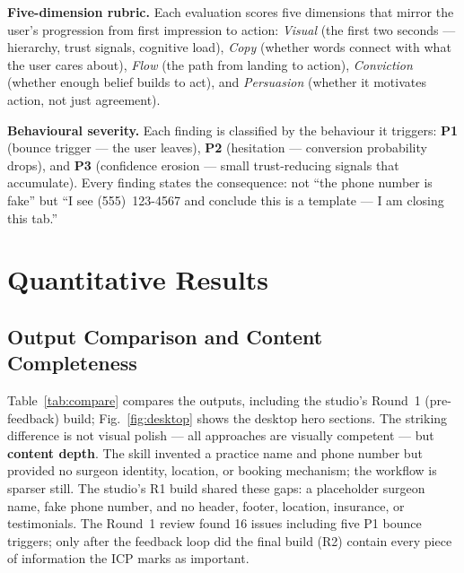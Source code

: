 \documentclass[a4paper]{llncs}
\begin{document}
\textbf{Five-dimension rubric.} Each evaluation scores five dimensions that
mirror the user's progression from first impression to action: \emph{Visual}
(the first two seconds --- hierarchy, trust signals, cognitive load),
\emph{Copy} (whether words connect with what the user cares about), \emph{Flow}
(the path from landing to action), \emph{Conviction} (whether enough belief
builds to act), and \emph{Persuasion} (whether it motivates action, not just
agreement).

\textbf{Behavioural severity.} Each finding is classified by the behaviour it
triggers: \textbf{P1} (bounce trigger --- the user leaves), \textbf{P2}
(hesitation --- conversion probability drops), and \textbf{P3} (confidence
erosion --- small trust-reducing signals that accumulate). Every finding states
the consequence: not ``the phone number is fake'' but ``I see (555)~123-4567
and conclude this is a template --- I am closing this tab.''

\section{Quantitative Results}
\label{sec:results}

\subsection{Output Comparison and Content Completeness}

Table~\ref{tab:compare} compares the outputs, including the studio's Round~1
(pre-feedback) build; Fig.~\ref{fig:desktop} shows the desktop hero sections.
The striking difference is not visual polish --- all approaches are visually
competent --- but \textbf{content depth}. The skill invented a practice name
and phone number but provided no surgeon identity, location, or booking
mechanism; the workflow is sparser still. The studio's R1 build shared these
gaps: a placeholder surgeon name, fake phone number, and no header, footer,
location, insurance, or testimonials. The Round~1 review found 16 issues
including five P1 bounce triggers; only after the feedback loop did the final
build (R2) contain every piece of information the ICP marks as important.
\end{document}
